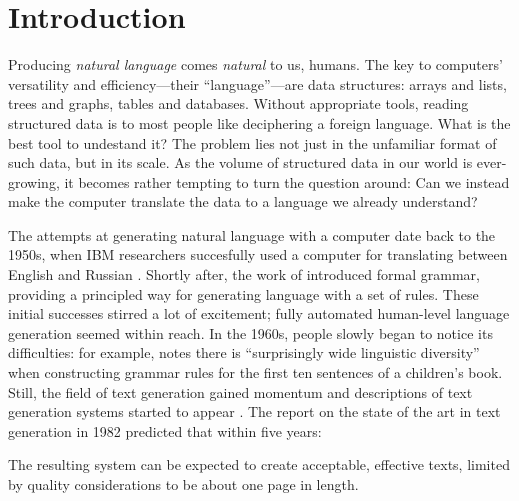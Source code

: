 \chapter{Introduction}
\label{chap:intro}
Producing \emph{natural language} comes \emph{natural} to us, humans.
The key to computers' versatility and efficiency---their ``language''---are data structures: arrays and lists, trees and graphs, tables and databases.
Without appropriate tools, reading structured data is to most people like deciphering a foreign language. What is the best tool to undestand it? The problem lies not just in the unfamiliar format of such data, but in its scale. As the volume of structured data in our world is ever-growing, it becomes rather tempting to turn the question around: Can we instead make the computer translate the data to a language we already understand?

The attempts at generating natural language with a computer date back to the 1950s, when IBM researchers succesfully used a computer for translating between English and Russian \cite{sheridan1955research}. Shortly after, the work of \citet{chomsky1957syntactic} introduced formal grammar, providing a principled way for generating language with a set of rules. These initial successes stirred a lot of excitement; fully automated human-level language generation seemed within reach. In the 1960s, people slowly began to notice its difficulties: for example, \citet{yngve1961random} notes there is ``surprisingly wide linguistic diversity'' when constructing grammar rules for the first ten sentences of a children's book. Still, the field of text generation gained momentum and descriptions of text generation systems started to appear \cite[\emph{inter alia}]{woolley-1969-automatic,meehan-1975-using,mcdonald-1975-framework,wang-1980-computational}. The report on the state of the art in text generation in 1982 predicted that within five years:
\begin{pquotation}{\citealp{mann-1982-text}}
    The resulting system can be expected to create acceptable, effective texts, limited by quality considerations to be about one page in length.\hspace{2cm}
\end{pquotation}

